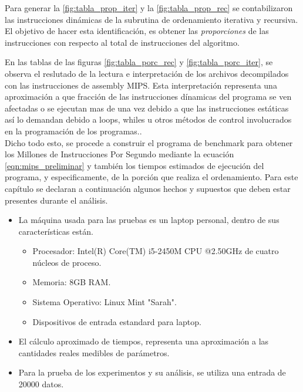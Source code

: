 \documentclass{memoria}
\begin{document}
Para generar la \ref{fig:tabla_prop_iter} y la \ref{fig:tabla_prop_rec} se contabilizaron las instrucciones dinámicas de la subrutina de ordenamiento iterativa y recursiva. El objetivo de hacer esta identificación, es obtener las \emph{proporciones} de las instrucciones con respecto al total de instrucciones del algoritmo.



En las tablas de las figuras \ref{fig:tabla_porc_rec} y \ref{fig:tabla_porc_iter}, se observa el reslutado de la lectura e interpretación de los archivos decompilados con las instrucciones de assembly MIPS. Esta interpretación representa una aproximación a que fracción de las instrucciones dínamicas del programa se ven afectadas o se ejecutan mas de una vez debido a que las instrucciones estáticas así lo demandan debido a loops, whiles u otros métodos de control involucrados en la programación de los programas.\cite{computer_organization}.
\\
Dicho todo esto, se procede a construir el programa de benchmark para obtener los Millones de Instrucciones Por Segundo mediante la ecuación \ref{eqn:mips_preliminar} y también los tiempos estimados de ejecución del programa, y especificamente, de la porción que realiza el ordenamiento.
Para este capítulo se declaran a continuación algunos hechos y supuestos que deben estar presentes durante el análisis.

\begin{itemize}
\item La máquina usada para las pruebas es un laptop personal, dentro de sus características están.
  \begin{itemize}
      \item Procesador: Intel(R) Core(TM) i5-2450M CPU @2.50GHz de cuatro núcleos de proceso.
      \item Memoria: 8GB RAM.
      \item Sistema Operativo: Linux Mint "Sarah".
      \item Dispositivos de entrada estandard para laptop.
	\end{itemize}
\item El cálculo aproximado de tiempos, representa una aproximación a las cantidades reales medibles de parámetros.
\item Para la prueba de los experimentos y su análisis, se utiliza una entrada de 20000 datos.
\end{itemize}
\end{document}
